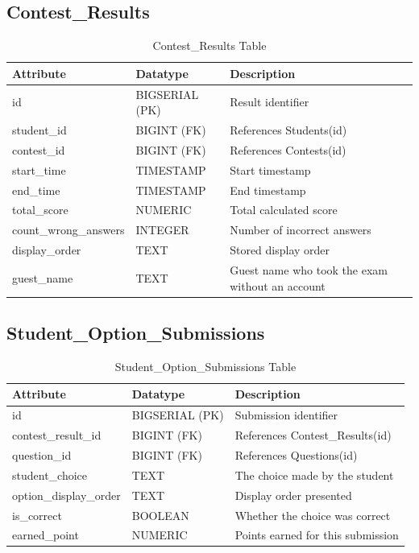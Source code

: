 \documentclass[../report_main.tex]{subfiles}
\begin{document}
\subsection{Contest\_Results}
\begin{table}[H]
\centering
\caption{Contest\_Results Table}
\label{tab:contest_results}
\renewcommand{\arraystretch}{1.25}
\begin{tabular}{|p{4cm}|p{3.5cm}|p{7.5cm}|}
\hline
\textbf{Attribute} & \textbf{Datatype} & \textbf{Description} \\ \hline
id & BIGSERIAL (PK) & Result identifier \\ \hline
student\_id & BIGINT (FK) & References Students(id) \\ \hline
contest\_id & BIGINT (FK) & References Contests(id) \\ \hline
start\_time & TIMESTAMP & Start timestamp \\ \hline
end\_time & TIMESTAMP & End timestamp \\ \hline
total\_score & NUMERIC & Total calculated score \\ \hline
count\_wrong\_answers & INTEGER & Number of incorrect answers \\ \hline
display\_order & TEXT & Stored display order \\ \hline
guest\_name & TEXT & Guest name who took the exam without an account \\ \hline
\end{tabular}
\end{table}

\subsection{Student\_Option\_Submissions}
\begin{table}[H]
\centering
\caption{Student\_Option\_Submissions Table}
\label{tab:student_option_submissions}
\renewcommand{\arraystretch}{1.25}
\begin{tabular}{|p{4cm}|p{3.5cm}|p{7.5cm}|}
\hline
\textbf{Attribute} & \textbf{Datatype} & \textbf{Description} \\ \hline
id & BIGSERIAL (PK) & Submission identifier \\ \hline
contest\_result\_id & BIGINT (FK) & References Contest\_Results(id) \\ \hline
question\_id & BIGINT (FK) & References Questions(id) \\ \hline
student\_choice & TEXT & The choice made by the student \\ \hline
option\_display\_order & TEXT & Display order presented \\ \hline
is\_correct & BOOLEAN & Whether the choice was correct \\ \hline
earned\_point & NUMERIC & Points earned for this submission \\ \hline
\end{tabular}
\end{table}
\end{document}

